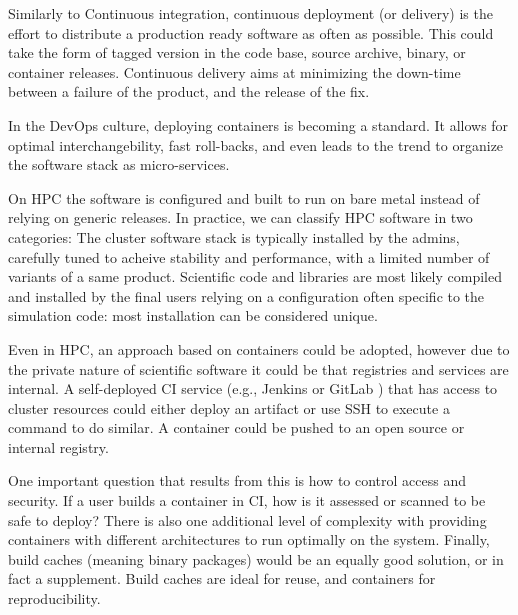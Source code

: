 Similarly to Continuous integration, continuous deployment (or delivery) is the
effort to distribute a production ready software as often as possible. This
could take the form of tagged version in the code base, source archive, binary,
or container releases. Continuous delivery aims at minimizing the down-time
between a failure of the product, and the release of the fix.

In the DevOps culture, deploying containers is becoming a standard. It allows
for optimal interchangebility, fast roll-backs, and even leads to the trend
to organize the software stack as micro-services.

On HPC the software is configured and built to run on bare metal instead of
relying on generic releases. In practice, we can classify HPC software in two
categories: The cluster software stack is typically installed by the admins,
carefully tuned to acheive stability and performance, with a limited number of
variants of a same product. Scientific code and libraries are most likely
compiled and installed by the final users relying on a configuration often
specific to the simulation code: most installation can be considered unique.

Even in HPC, an approach based on containers could be adopted, however due to
the private nature of scientific software it could be that registries and
services are internal. A self-deployed CI service (e.g., Jenkins or GitLab
\cite{jenkins,gitlab}) that has access to cluster resources could either deploy
an artifact or use SSH to execute a command to do similar. A container could be
pushed to an open source or internal registry.

One important question that results from this is how to control access and
security. If a user builds a container in CI, how is it assessed or scanned to
be safe to deploy?  There is also one additional level of complexity with
providing containers with different architectures to run optimally on the
system. Finally, build caches (meaning binary packages) would be an equally
good solution, or in fact a supplement. Build caches are ideal for reuse, and
containers for reproducibility.
